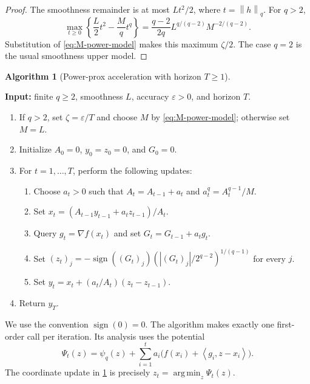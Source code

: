 \documentclass[11pt]{article}
\newcommand{\ip}[2]{\left\langle #1,#2\right\rangle}
\newcommand{\norm}[2]{\left\lVert #1\right\rVert_{#2}}
\newcommand{\argmin}{\operatorname*{arg\,min}}
\newcommand{\sign}{\operatorname{sign}}
\newcommand{\eps}{\varepsilon}
\theoremstyle{definition}
\newtheorem{algorithm}{Algorithm}
\theoremstyle{remark}
\begin{document}
\begin{proof}
The smoothness remainder is at most $Lt^2/2$, where $t=\norm{h}{q}$.
For $q>2$,
\[
 \max_{t\ge0}\left\{\frac L2t^2-\frac Mqt^q\right\}
 =\frac{q-2}{2q}L^{q/(q-2)}M^{-2/(q-2)}.
\]
Substitution of \cref{eq:M-power-model} makes this maximum $\zeta/2$.
The case $q=2$ is the usual smoothness upper model.
\end{proof}

\par\medskip\noindent
\begin{minipage}{\textwidth}
\begin{algorithm}[Power-prox acceleration with horizon $T\ge1$]
\label{alg:power-prox}
\mbox{}\par\smallskip
\noindent\textbf{Input:} finite $q\ge2$, smoothness $L$, accuracy $\eps>0$, and horizon $T$.
\begin{enumerate}[leftmargin=1.7em,itemsep=4pt]
\item If $q>2$, set $\zeta=\eps/T$ and choose $M$ by \cref{eq:M-power-model}; otherwise set $M=L$.
\item Initialize $A_0=0$, $y_0=z_0=0$, and $G_0=0$.
\item For $t=1,\ldots,T$, perform the following updates:
\begin{enumerate}[label=(\alph*),leftmargin=1.7em,itemsep=4pt]
 \item Choose $a_t>0$ such that $A_t=A_{t-1}+a_t$ and $a_t^q=A_t^{q-1}/M$.
 \item Set $x_t=(A_{t-1}y_{t-1}+a_tz_{t-1})/A_t$.
 \item Query $g_t=\nabla f(x_t)$ and set $G_t=G_{t-1}+a_tg_t$.
 \item Set $(z_t)_j=-\sign((G_t)_j)(|(G_t)_j|/2^{q-2})^{1/(q-1)}$ for every $j$.
 \item Set $y_t=x_t+(a_t/A_t)(z_t-z_{t-1})$.
\end{enumerate}
\item Return $y_T$.
\end{enumerate}
\end{algorithm}
\end{minipage}
\par\medskip

We use the convention $\sign(0)=0$.
The algorithm makes exactly one first-order call per iteration.
Its analysis uses the potential
\begin{equation}
\label{eq:power-potential}
 \Psi_t(z)=\psi_q(z)+
 \sum_{i=1}^t a_i\bigl(f(x_i)+\ip{g_i}{z-x_i}\bigr).
\end{equation}
The coordinate update in \cref{alg:power-prox} is precisely
$z_t=\argmin_z\Psi_t(z)$.
\end{document}
